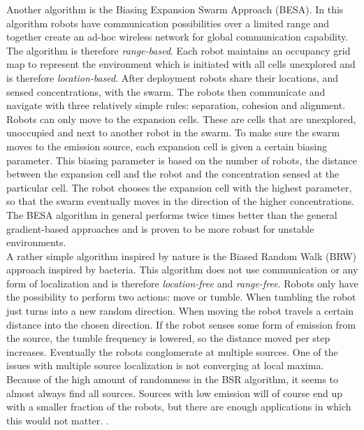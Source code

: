     Another algorithm is the Biasing Expansion Swarm Approach (BESA).
    In this algorithm robots have communication possibilities over a limited range and together create an ad-hoc wireless network for global communication capability.
    The algorithm is therefore \emph{range-based}.
    Each robot maintains an occupancy grid map to represent the environment which is initiated with all cells unexplored and is therefore \emph{location-based}.
    After deployment robots share their locations, and sensed concentrations, with the swarm.
    The robots then communicate and navigate with three relatively simple rules: separation, cohesion and alignment.
    Robots can only move to the expansion cells. 
    These are cells that are unexplored, unoccupied and next to another robot in the swarm.
    To make sure the swarm moves to the emission source, each expansion cell is given a certain biasing parameter.
    This biasing parameter is based on the number of robots, the distance between the expansion cell and the robot and the concentration sensed at the particular cell.
    The robot chooses the expansion cell with the highest parameter, so that the swarm eventually moves in the direction of the higher concentrations.
    The BESA algorithm in general performs twice times better than the general gradient-based approaches and is proven to be more robust for unstable environments. \cite{cui2004swarm}\\

    A rather simple algorithm inspired by nature is the Biased Random Walk (BRW) approach inspired by bacteria.
    This algorithm does not use communication or any form of localization and is therefore \emph{location-free} and \emph{range-free}.
    Robots only have the possibility to perform two actions: move or tumble.
    When tumbling the robot just turns into a new random direction.
    When moving the robot travels a certain distance into the chosen direction.
    If the robot senses some form of emission from the source, the tumble frequency is lowered, so the distance moved per step increases.
    Eventually the robots conglomerate at multiple sources.
    One of the issues with multiple source localization is not converging at local maxima.
    Because of the high amount of randomness in the BSR algorithm, it seems to almost always find all sources. 
    Sources with low emission will of course end up with a smaller fraction of the robots, but there are enough applications in which this would not matter. \cite{dhariwal2004bacterium}.

